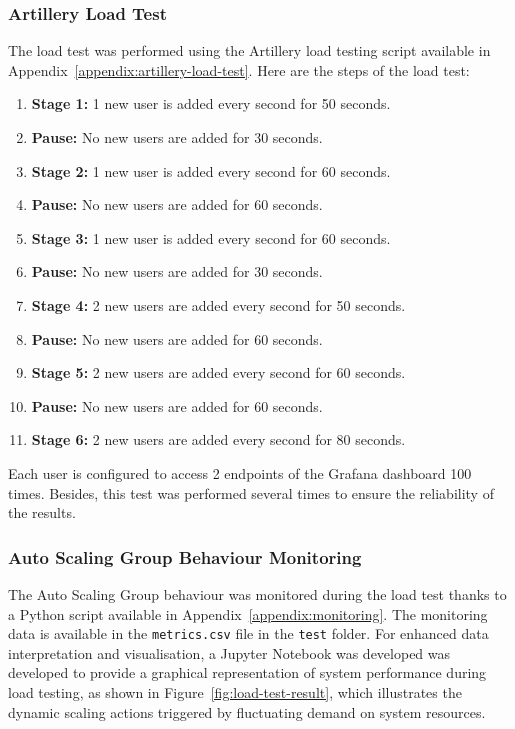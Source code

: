 \documentclass[12pt,oneside]{book} %
\begin{document}
\subsubsection{Artillery Load Test}
The load test was performed using the Artillery load testing script available
in Appendix~\ref{appendix:artillery-load-test}. Here are the steps of the load
test:
\begin{enumerate}
    \item \textbf{Stage 1:} 1 new user is added every second for 50 seconds.
    \item \textbf{Pause:} No new users are added for 30 seconds.
    \item \textbf{Stage 2:} 1 new user is added every second for 60 seconds.
    \item \textbf{Pause:} No new users are added for 60 seconds.
    \item \textbf{Stage 3:} 1 new user is added every second for 60 seconds.
    \item \textbf{Pause:} No new users are added for 30 seconds.
    \item \textbf{Stage 4:} 2 new users are added every second for 50 seconds.
    \item \textbf{Pause:} No new users are added for 60 seconds.
    \item \textbf{Stage 5:} 2 new users are added every second for 60 seconds.
    \item \textbf{Pause:} No new users are added for 60 seconds.
    \item \textbf{Stage 6:} 2 new users are added every second for 80 seconds.
\end{enumerate}
Each user is configured to access 2 endpoints of the Grafana dashboard 100 times. Besides, this test was performed several times to ensure the reliability of the results.

\subsubsection{Auto Scaling Group Behaviour Monitoring}
The Auto Scaling Group behaviour was monitored during the load test thanks to a
Python script available in Appendix~\ref{appendix:monitoring}. The monitoring
data is available in the \texttt{metrics.csv} file in the \texttt{test} folder.
For enhanced data interpretation and visualisation, a Jupyter Notebook was
developed was developed to provide a graphical representation of system
performance during load testing, as shown in Figure~\ref{fig:load-test-result},
which illustrates the dynamic scaling actions triggered by fluctuating demand
on system resources.
\end{document}
